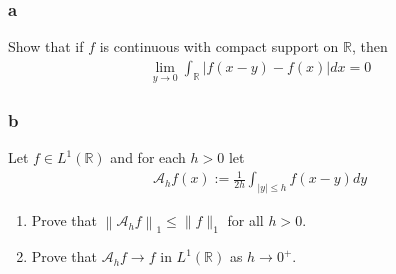 \hypertarget{a-9}{%
\subsubsection{a}\label{a-9}}

Show that if \(f\) is continuous with compact support on
\({\mathbb{R}}\), then
\begin{align*}
\lim _{y \rightarrow 0} \int_{\mathbb{R}}|f(x-y)-f(x)| d x=0
\end{align*}

\hypertarget{b-9}{%
\subsubsection{b}\label{b-9}}

Let \(f\in L^1({\mathbb{R}})\) and for each \(h > 0\) let
\begin{align*}
\mathcal{A}_{h} f(x):=\frac{1}{2 h} \int_{|y| \leq h} f(x-y) d y
\end{align*}

\begin{enumerate}
\def\labelenumi{\roman{enumi}.}
\item
  Prove that \(\left\|\mathcal{A}_{h} f\right\|_{1} \leq\|f\|_{1}\) for
  all \(h > 0\).
\item
  Prove that \(\mathcal{A}_h f \to f\) in \(L^1({\mathbb{R}})\) as
  \(h \to 0^+\).
\end{enumerate}


